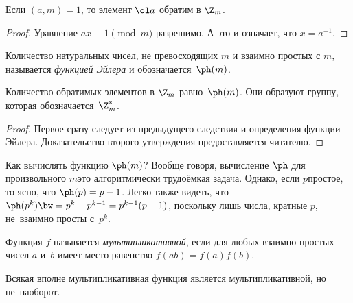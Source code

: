 \documentclass[a4paper]{article}
\begin{document}
\begin{imp}
Если $(a,m)=1$, то элемент $\ol a$ обратим в $\Z_m$.
\end{imp}
\begin{proof}
Уравнение $ax\equiv1\pmod{m}$ разрешимо. А это и означает, что $x = a^{-1}$.
\end{proof}

\begin{df}
Количество натуральных чисел, не превосходящих $m$ и взаимно простых с $m$, называется \emph{функцией Эйлера} и обозначается~$\ph(m)$.
\end{df}

\begin{stm}
Количество обратимых элементов в $\Z_m$ равно~$\ph(m)$. Они образуют группу, которая обозначается~$\Z_m^*$.
\end{stm}
\begin{proof}
Первое сразу следует из предыдущего следствия и определения функции Эйлера. Доказательство второго утверждения
предоставляется читателю.
\end{proof}

Как вычислять функцию $\ph(m)$? Вообще говоря, вычисление $\ph$ для произвольного $m$\т это алгоритмически трудоёмкая задача.
Однако, если $p$\т простое, то ясно, что $\ph(p)=p-1$. Легко также видеть, что $\ph(p^k)\bw=p^k-p^{k-1}=p^{k-1}(p-1)$,
поскольку лишь числа, кратные $p$, не~взаимно просты с~$p^k$.

\begin{df}
Функция $f$ называется \emph{мультипликативной}, если для любых взаимно простых чисел $a$ и~$b$ имеет место равенство $f(ab)=f(a)f(b)$.
\end{df}

\begin{note}
Всякая вполне мультипликативная функция является мультипликативной, но не~наоборот.
\end{note}
\end{document}
